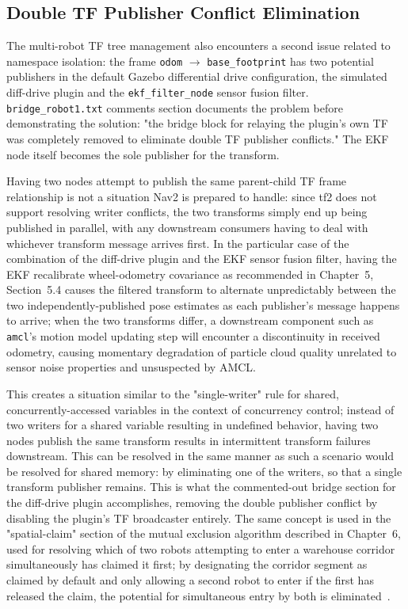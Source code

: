 \subsection{Double TF Publisher Conflict Elimination}

The multi-robot TF tree management also encounters a second issue related to namespace isolation: the frame \texttt{odom} $\rightarrow$ \texttt{base\_footprint} has two potential publishers in the default Gazebo differential drive configuration, the simulated diff-drive plugin and the \texttt{ekf\_filter\_node} sensor fusion filter. \texttt{bridge\_robot1.txt} comments section documents the problem before demonstrating the solution: "the bridge block for relaying the plugin's own TF was completely removed to eliminate double TF publisher conflicts." The EKF node itself becomes the sole publisher for the transform.

Having two nodes attempt to publish the same parent-child TF frame relationship is not a situation Nav2 is prepared to handle: since tf2 does not support resolving writer conflicts, the two transforms simply end up being published in parallel, with any downstream consumers having to deal with whichever transform message arrives first. In the particular case of the combination of the diff-drive plugin and the EKF sensor fusion filter, having the EKF recalibrate wheel-odometry covariance as recommended in Chapter~5, Section~5.4 causes the filtered transform to alternate unpredictably between the two independently-published pose estimates as each publisher's message happens to arrive; when the two transforms differ, a downstream component such as \texttt{amcl}'s motion model updating step will encounter a discontinuity in received odometry, causing momentary degradation of particle cloud quality unrelated to sensor noise properties and unsuspected by AMCL.

This creates a situation similar to the "single-writer" rule for shared, concurrently-accessed variables in the context of concurrency control; instead of two writers for a shared variable resulting in undefined behavior, having two nodes publish the same transform results in intermittent transform failures downstream. This can be resolved in the same manner as such a scenario would be resolved for shared memory: by eliminating one of the writers, so that a single transform publisher remains. This is what the commented-out bridge section for the diff-drive plugin accomplishes, removing the double publisher conflict by disabling the plugin's TF broadcaster entirely. The same concept is used in the "spatial-claim" section of the mutual exclusion algorithm described in Chapter~6, used for resolving which of two robots attempting to enter a warehouse corridor simultaneously has claimed it first; by designating the corridor segment as claimed by default and only allowing a second robot to enter if the first has released the claim, the potential for simultaneous entry by both is eliminated~\cite{abaza2025aicovariance}.

